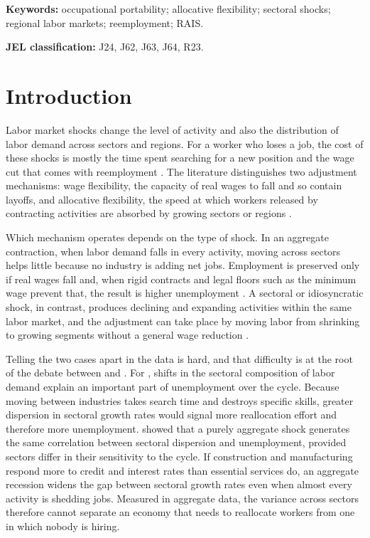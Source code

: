 \documentclass[11pt,a4paper]{article}
\let\citetorig\citet
\let\citeporig\citep
\renewcommand{\citet}[1]{{\color{citeblue}\citetorig{#1}}}
\renewcommand{\citep}[1]{{\color{citeblue}\citeporig{#1}}}
\let\secaoorig\section
\renewcommand{\section}{\clearpage\secaoorig}
\begin{document}
\begin{titlepage}
\begin{minipage}{0.88\textwidth}
\vspace{9pt}
\textbf{Keywords:} occupational portability; allocative flexibility; sectoral shocks; regional labor markets; reemployment; RAIS.\par
\vspace{3pt}
\textbf{JEL classification:} J24, J62, J63, J64, R23.
\end{minipage}
\end{titlepage}
\setcounter{page}{1}

\section{Introduction}

Labor market shocks change the level of activity and also the distribution of labor demand across sectors and regions. For a worker who loses a job, the cost of these shocks is mostly the time spent searching for a new position and the wage cut that comes with reemployment \citep{jacobson1993, couch2010}. The literature distinguishes two adjustment mechanisms: wage flexibility, the capacity of real wages to fall and so contain layoffs, and allocative flexibility, the speed at which workers released by contracting activities are absorbed by growing sectors or regions \citep{layard1991, barros1997td, barros1997ppp}.

Which mechanism operates depends on the type of shock. In an aggregate contraction, when labor demand falls in every activity, moving across sectors helps little because no industry is adding net jobs. Employment is preserved only if real wages fall and, when rigid contracts and legal floors such as the minimum wage prevent that, the result is higher unemployment \citep{shapiro1984, pissarides2000}. A sectoral or idiosyncratic shock, in contrast, produces declining and expanding activities within the same labor market, and the adjustment can take place by moving labor from shrinking to growing segments without a general wage reduction \citep{barros1997ppp}.

Telling the two cases apart in the data is hard, and that difficulty is at the root of the debate between \citet{lilien1982} and \citet{abraham1986}. For \citet{lilien1982}, shifts in the sectoral composition of labor demand explain an important part of unemployment over the cycle. Because moving between industries takes search time and destroys specific skills, greater dispersion in sectoral growth rates would signal more reallocation effort and therefore more unemployment. \citet{abraham1986} showed that a purely aggregate shock generates the same correlation between sectoral dispersion and unemployment, provided sectors differ in their sensitivity to the cycle. If construction and manufacturing respond more to credit and interest rates than essential services do, an aggregate recession widens the gap between sectoral growth rates even when almost every activity is shedding jobs. Measured in aggregate data, the variance across sectors therefore cannot separate an economy that needs to reallocate workers from one in which nobody is hiring.
\end{document}
